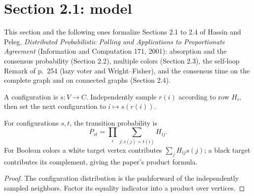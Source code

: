 \section{Section 2.1: model}\label{sec:hassin-peleg}
This section and the following ones formalize Sections 2.1 to 2.4 of Hassin and Peleg,
\emph{Distributed Probabilistic Polling and Applications to Proportionate Agreement}
(Information and Computation 171, 2001): absorption and the consensus probability (Section 2.2),
multiple colors (Section 2.3), the self-loop Remark of p.~254 (lazy voter and Wright--Fisher),
and the consensus time on the complete graph and on connected graphs (Section 2.4).
\begin{definition}\label{def:step}
\leanok{}
A configuration is $s:V\to C$. Independently sample $r(i)$ according to row
$H_i$, then set the next configuration to $i\mapsto s(r(i))$.
\end{definition}
\begin{lemma}\label{lem:product}
\leanok{}
For configurations $s,t$, the transition probability is
\[P_{st}=\prod_i\sum_{j:s(j)=t(i)}H_{ij}.\]
For Boolean colors a white target vertex contributes $\sum_j H_{ij}s(j)$;
a black target contributes its complement, giving the paper's product formula.
\end{lemma}
\begin{proof}\leanok
The configuration distribution is the pushforward of the independently sampled
neighbors. Factor its equality indicator into a product over vertices.
\end{proof}

